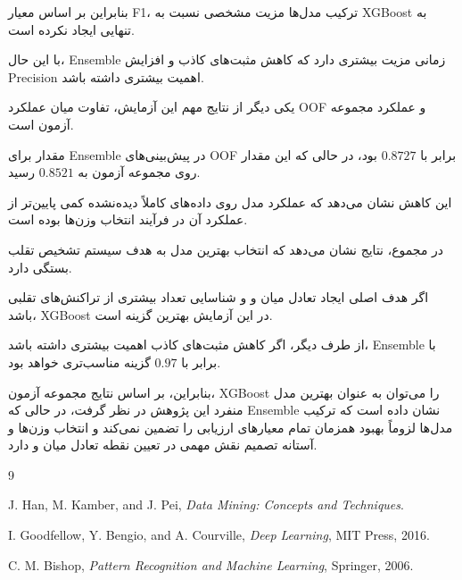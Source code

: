 \documentclass[10pt,a4paper,twocolumn]{article}
\begin{document}
بنابراین بر اساس معیار F1، ترکیب مدل‌ها مزیت مشخصی نسبت به
XGBoost به تنهایی ایجاد نکرده است.

با این حال، Ensemble زمانی مزیت بیشتری دارد که کاهش
مثبت‌های کاذب و افزایش Precision اهمیت بیشتری داشته باشد.

یکی دیگر از نتایج مهم این آزمایش، تفاوت میان عملکرد OOF و
عملکرد مجموعه آزمون است.

مقدار  برای Ensemble در پیش‌بینی‌های OOF برابر
با $0.8727$ بود، در حالی که این مقدار روی مجموعه آزمون به
$0.8521$ رسید.

این کاهش نشان می‌دهد که عملکرد مدل روی داده‌های کاملاً
دیده‌نشده کمی پایین‌تر از عملکرد آن در فرآیند انتخاب وزن‌ها
بوده است.

در مجموع، نتایج نشان می‌دهد که انتخاب بهترین مدل به هدف
سیستم تشخیص تقلب بستگی دارد.

اگر هدف اصلی ایجاد تعادل میان  و 
و شناسایی تعداد بیشتری از تراکنش‌های تقلبی باشد، XGBoost
در این آزمایش بهترین گزینه است.

از طرف دیگر، اگر کاهش مثبت‌های کاذب اهمیت بیشتری داشته باشد،
Ensemble با  برابر با $0.97$ گزینه مناسب‌تری
خواهد بود.

بنابراین، بر اساس نتایج مجموعه آزمون، XGBoost را می‌توان
به عنوان بهترین مدل منفرد این پژوهش در نظر گرفت، در حالی
که Ensemble نشان داده است که ترکیب مدل‌ها لزوماً بهبود
همزمان تمام معیارهای ارزیابی را تضمین نمی‌کند و انتخاب
وزن‌ها و آستانه تصمیم نقش مهمی در تعیین نقطه تعادل میان
 و  دارد.



\begin{thebibliography}{9}

J. Han, M. Kamber, and J. Pei,
\textit{Data Mining: Concepts and Techniques}.

I. Goodfellow, Y. Bengio, and A. Courville,
\textit{Deep Learning},
MIT Press, 2016.

C. M. Bishop,
\textit{Pattern Recognition and Machine Learning},
Springer, 2006.

\end{thebibliography}
\end{document}
